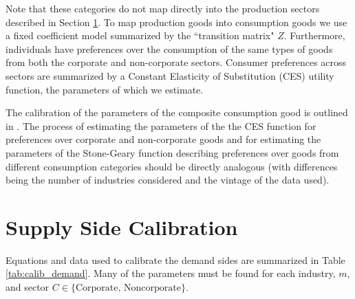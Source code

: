 \documentclass[article,11pt,letterpaper,fleqn]{article}
\theoremstyle{definition}
\numberwithin{equation}{section}
\newcommand{\cn}{\citeasnoun} %
\begin{document}
Note that these categories do not map directly into the production sectors described in Section \ref{sec:supply_calib}.  To map production goods into consumption goods we use a fixed coefficient model summarized by the ``transition matrix" $Z$.  Furthermore, individuals have preferences over the consumption of the same types of goods from both the corporate and non-corporate sectors.  Consumer preferences across sectors are summarized by a Constant Elasticity of Substitution (CES) utility function, the parameters of which we estimate.

The calibration of the parameters of the composite consumption good is outlined in \cn{FR1993}.  The process of estimating the parameters of the the CES function for preferences over corporate and non-corporate goods and for estimating the parameters of the Stone-Geary function describing preferences over goods from different consumption categories should be directly analogous (with differences being the number of industries considered and the vintage of the data used).

\section{Supply Side Calibration}
\label{sec:supply_calib}

Equations and data used to calibrate the demand sides are summarized in Table \ref{tab:calib_demand}.  Many of the parameters must be found for each industry, $m$, and sector $C\in\{\text{Corporate, Noncorporate}\}$.
\end{document}
